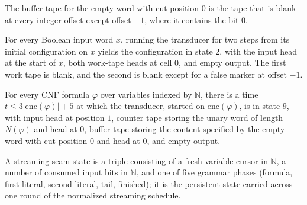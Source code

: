 \begin{lemma}
\label{Complexity.satRedBuffer_empty}
\leanok
{}
The buffer tape for the empty word with cut position $0$ is the tape that is blank at
every integer offset except offset $-1$, where it contains the bit $0$.
\end{lemma}

\begin{lemma}
\label{Complexity.satRed_init}
\leanok
{}
For every Boolean input word $x$, running the transducer for two steps from its initial
configuration on $x$ yields the configuration in state $2$, with the input head at the
start of $x$, both work-tape heads at cell $0$, and empty output. The first work tape is
blank, and the second is blank except for a false marker at offset $-1$.
\end{lemma}

\begin{lemma}
\label{Complexity.satRed_start}
\leanok
{}
For every CNF formula $\varphi$ over variables indexed by $\mathbb{N}$, there is a time
$t \le 3|\mathrm{enc}(\varphi)|+5$ at which the transducer, started on
$\mathrm{enc}(\varphi)$, is in state $9$, with input head at position $1$, counter tape
storing the unary word of length $N(\varphi)$ and head at $0$, buffer tape storing the
content specified by the empty word with cut position $0$ and head at $0$, and empty
output.
\end{lemma}
\begin{definition}
\label{Complexity.SatStreamState}
\leanok
A streaming seam state is a triple consisting of a fresh-variable cursor in
$\mathbb{N}$, a number of consumed input bits in $\mathbb{N}$, and one of five
grammar phases (formula, first literal, second literal, tail, finished); it is the
persistent state carried across one round of the normalized streaming schedule.
\end{definition}

